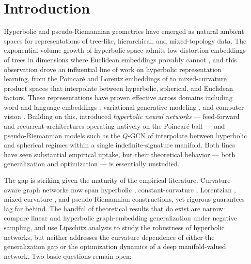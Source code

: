 \documentclass[letterpaper]{article}
\begin{document}
\section{Introduction}
\label{sec:intro}

Hyperbolic and pseudo-Riemannian geometries have emerged as natural
ambient spaces for representations of tree-like, hierarchical, and
mixed-topology data. The exponential volume growth of hyperbolic space
admits low-distortion embeddings of trees in dimensions where Euclidean
embeddings provably cannot \cite{sala2018representation},
and this observation drove an influential line of work on hyperbolic
representation learning, from the Poincar\'e and Lorentz embeddings of
\cite{nickel2017poincare, nickel2018learning} to mixed-curvature product
spaces \cite{gu2018learning} that interpolate between hyperbolic,
spherical, and Euclidean factors. These representations have proven
effective across domains including word and language embeddings
\cite{tifrea2018poincar}, variational generative modeling
\cite{mathieu2019continuous, skopek2019mixed}, and computer vision
\cite{khrulkov2020hyperbolic, atigh2022hyperbolic}. Building on this,
\cite{tifrea2018poincar} introduced \emph{hyperbolic neural networks} ---
feed-forward and recurrent architectures operating natively on the
Poincar\'e ball --- and pseudo-Riemannian models such as the $Q$-GCN of
\cite{xiong2022pseudo} interpolate between hyperbolic and spherical
regimes within a single indefinite-signature manifold. Both lines have
seen substantial empirical uptake, but their theoretical behavior --- both
generalization and optimization --- is essentially unstudied.

The gap is striking given the maturity of the empirical literature.
Curvature-aware graph networks now span hyperbolic
\cite{yang2022hyperbolic}, constant-curvature
\cite{bachmann2020constant}, Lorentzian \cite{zhang2021lorentzian},
mixed-curvature \cite{sun2022self, wang2021mixed}, and
pseudo-Riemannian \cite{xiong2022pseudo, law2021ultrahyperbolic}
constructions, yet rigorous guarantees lag far behind. The handful of
theoretical results that do exist are narrow: \cite{suzuki2021generalization}
compare linear and hyperbolic graph-embedding generalization under
negative sampling, and \cite{li2024improving} use Lipschitz analysis to
study the robustness of hyperbolic networks, but neither addresses the
curvature dependence of either the generalization gap or the optimization
dynamics of a deep manifold-valued network. Two basic questions remain
open:
\end{document}
